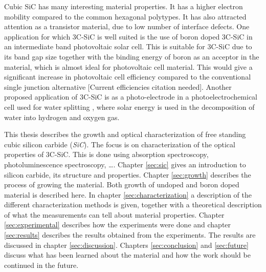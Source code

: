 Cubic SiC has many interesting material properties. It has a higher electron mobility compared to the common hexagonal polytypes. It has also attracted attention as a transistor material, due to low number of interface defects. One application for which 3C-SiC is well suited is the use of boron doped 3C-SiC in an intermediate band photovoltaic solar cell. This is suitable for 3C-SiC due to its band gap size together with the binding energy of boron as an acceptor in the material, which is almost ideal for photovoltaic cell material. This would give a significant increase in photovoltaic cell efficiency compared to the conventional single junction alternative \cite{Richards2003}[Current efficiencies citation needed]. Another proposed application of 3C-SiC is as a photo-electrode in a photoelectrochemical cell used for water splitting \cite{Kato2014,Yasuda2012}, where solar energy is used in the decomposition of water into hydrogen and oxygen gas. 

This thesis describes the growth and optical characterization of free standing cubic silicon carbide (\emph{SiC}).  The focus is on characterization of the optical properties of 3C-SiC. This is done using absorption spectroscopy, photoluminescence spectroscopy, \dots. Chapter \ref{sec:sic} gives an introduction to silicon carbide, its structure and properties. Chapter \ref{sec:growth} describes the process of growing the material. Both growth of undoped and boron doped material is described here. In chapter \ref{sec:characterization} a description of the different characterization methods is given, together with a theoretical description of what the measurements can tell about material properties. Chapter \ref{sec:experimental} describes how the experiments were done and chapter \ref{sec:results} describes the results obtained from the experiments. The results are discussed in chapter \ref{sec:discussion}. Chapters \ref{sec:conclusion} and \ref{sec:future} discuss what has been learned about the material and how the work should be continued in the future. 



































